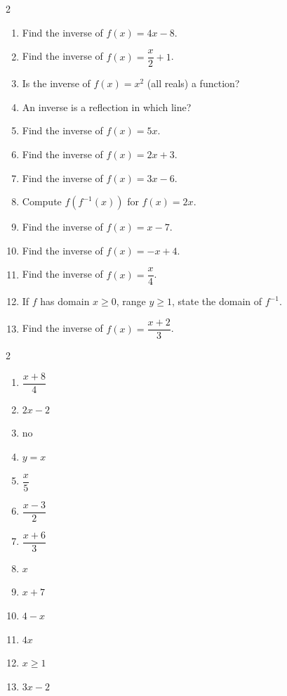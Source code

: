 \documentclass[11pt]{article}
\begin{document}
\begin{recapbox}
\begin{multicols}{2}
\small
\begin{enumerate}[leftmargin=*,itemsep=3pt]
  \item Find the inverse of $f(x)=4x-8$.
  \item Find the inverse of $f(x)=\dfrac{x}{2}+1$.
  \item Is the inverse of $f(x)=x^2$ (all reals) a function?
  \item An inverse is a reflection in which line?
  \item Find the inverse of $f(x)=5x$.
  \item Find the inverse of $f(x)=2x+3$.
  \item Find the inverse of $f(x)=3x-6$.
  \item Compute $f(f^{-1}(x))$ for $f(x)=2x$.
  \item Find the inverse of $f(x)=x-7$.
  \item Find the inverse of $f(x)=-x+4$.
  \item Find the inverse of $f(x)=\dfrac{x}{4}$.
  \item If $f$ has domain $x\ge0$, range $y\ge1$, state the domain of $f^{-1}$.
  \item Find the inverse of $f(x)=\dfrac{x+2}{3}$.
\end{enumerate}
\end{multicols}
\end{recapbox}

\begin{keybox}
\begin{multicols}{2}
\small
\begin{enumerate}[leftmargin=*,itemsep=3pt]
  \item $\dfrac{x+8}{4}$
  \item $2x-2$
  \item no
  \item $y=x$
  \item $\dfrac{x}{5}$
  \item $\dfrac{x-3}{2}$
  \item $\dfrac{x+6}{3}$
  \item $x$
  \item $x+7$
  \item $4-x$
  \item $4x$
  \item $x\ge1$
  \item $3x-2$
\end{enumerate}
\end{multicols}
\end{keybox}
\end{document}
